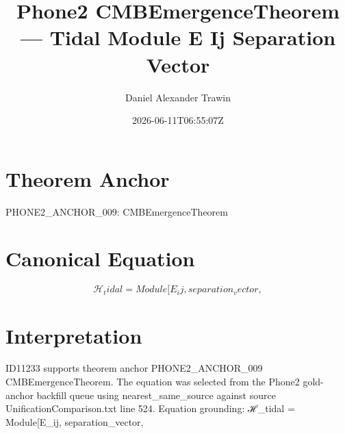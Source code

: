 \documentclass[11pt]{article}
\title{Phone2 CMBEmergenceTheorem — Tidal Module E Ij Separation Vector}
\author{Daniel Alexander Trawin}
\date{2026-06-11T06:55:07Z}
\begin{document}
\maketitle
\section*{Theorem Anchor}
PHONE2_ANCHOR_009: CMBEmergenceTheorem
\section*{Canonical Equation}
\[
ℋ_tidal = Module[{E_ij, separation_vector},
\]
\section*{Interpretation}
ID11233 supports theorem anchor PHONE2_ANCHOR_009 CMBEmergenceTheorem. The equation was selected from the Phone2 gold-anchor backfill queue using nearest_same_source against source UnificationComparison.txt line 524. Equation grounding: ℋ_tidal = Module[{E_ij, separation_vector},
\end{document}
